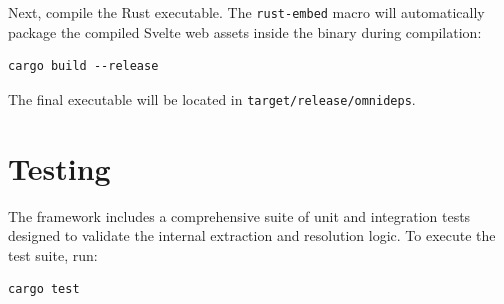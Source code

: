 Next, compile the Rust executable. The \texttt{rust-embed} macro will
automatically package the compiled Svelte web assets inside the
binary during compilation:
\begin{verbatim}
cargo build --release
\end{verbatim}
The final executable will be located in \texttt{target/release/omnideps}.

\section{Testing}
The framework includes a comprehensive suite of unit and integration
tests designed to validate the internal extraction and resolution
logic. To execute the test suite, run:
\begin{verbatim}
cargo test
\end{verbatim}
